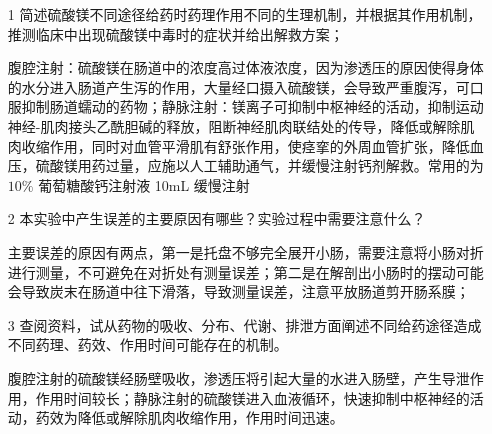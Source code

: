 \documentclass[UTF8]{ctexart}
\begin{document}
\begin{itemize}
    \item [1] 简述硫酸镁不同途径给药时药理作用不同的生理机制，并根据其作用机制，推测临床中出现硫酸镁中毒时的症状并给出解救方案；

        腹腔注射：硫酸镁在肠道中的浓度高过体液浓度，因为渗透压的原因使得身体的水分进入肠道产生泻的作用，大量经口摄入硫酸镁，会导致严重腹泻，可口服抑制肠道蠕动的药物；静脉注射：镁离子可抑制中枢神经的活动，抑制运动神经-肌肉接头乙酰胆碱的释放，阻断神经肌肉联结处的传导，降低或解除肌肉收缩作用，同时对血管平滑肌有舒张作用，使痉挛的外周血管扩张，降低血压，硫酸镁用药过量，应施以人工辅助通气，并缓慢注射钙剂解救。常用的为 $10\%$ 葡萄糖酸钙注射液 10mL 缓慢注射
    
    \item [2] 本实验中产生误差的主要原因有哪些？实验过程中需要注意什么？
     
        主要误差的原因有两点，第一是托盘不够完全展开小肠，需要注意将小肠对折进行测量，不可避免在对折处有测量误差；第二是在解剖出小肠时的摆动可能会导致炭末在肠道中往下滑落，导致测量误差，注意平放肠道剪开肠系膜；

    \item [3] 查阅资料，试从药物的吸收、分布、代谢、排泄方面阐述不同给药途径造成不同药理、药效、作用时间可能存在的机制。

        腹腔注射的硫酸镁经肠壁吸收，渗透压将引起大量的水进入肠壁，产生导泄作用，作用时间较长；静脉注射的硫酸镁进入血液循环，快速抑制中枢神经的活动，药效为降低或解除肌肉收缩作用，作用时间迅速。

\end{itemize}
    
\end{document}
